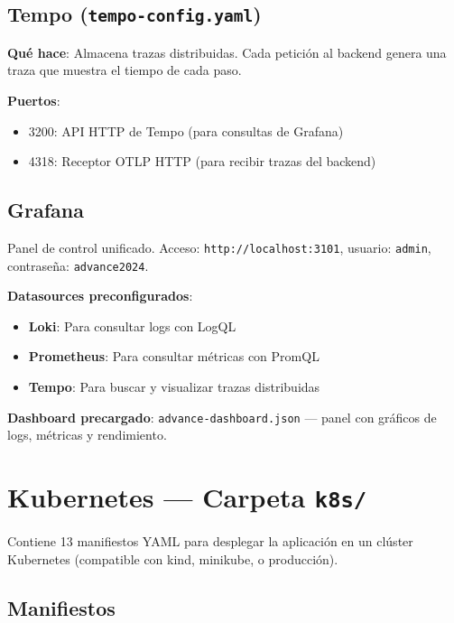 \documentclass[12pt,oneside]{article}
\begin{document}
\subsection{Tempo (\texttt{tempo-config.yaml})}

\textbf{Qué hace}: Almacena trazas distribuidas. Cada petición al backend genera una traza que muestra el tiempo de cada paso.

\textbf{Puertos}:
\begin{itemize}
    \item 3200: API HTTP de Tempo (para consultas de Grafana)
    \item 4318: Receptor OTLP HTTP (para recibir trazas del backend)
\end{itemize}

\subsection{Grafana}

Panel de control unificado. Acceso: \texttt{http://localhost:3101}, usuario: \texttt{admin}, contraseña: \texttt{advance2024}.

\textbf{Datasources preconfigurados}:
\begin{itemize}
    \item \textbf{Loki}: Para consultar logs con LogQL
    \item \textbf{Prometheus}: Para consultar métricas con PromQL
    \item \textbf{Tempo}: Para buscar y visualizar trazas distribuidas
\end{itemize}

\textbf{Dashboard precargado}: \texttt{advance-dashboard.json} — panel con gráficos de logs, métricas y rendimiento.

\section{Kubernetes — Carpeta \texttt{k8s/}}

Contiene 13 manifiestos YAML para desplegar la aplicación en un clúster Kubernetes (compatible con kind, minikube, o producción).

\subsection{Manifiestos}
\end{document}
